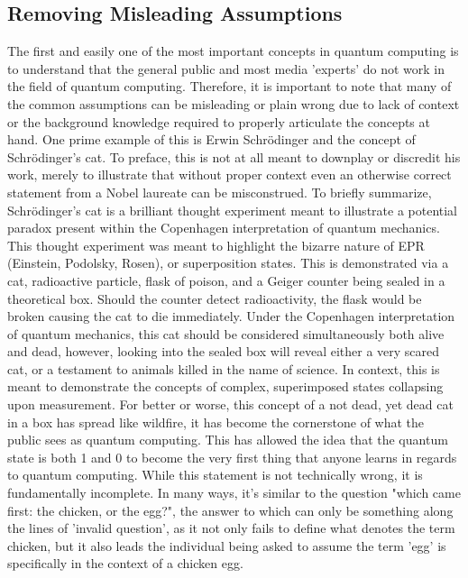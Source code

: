\documentclass[a4paper]{article}
\begin{document}
\subsection{Removing Misleading Assumptions} %
The first and easily one of the most important concepts in quantum computing is to understand that the general public and most media 'experts' do not work in the field of quantum computing.  Therefore, it is important to note that many of the common assumptions can be misleading or plain wrong due to lack of context or the background knowledge required to properly articulate the concepts at hand.\newline
\newline
One prime example of this is Erwin Schrödinger and the concept of Schrödinger's cat.  To preface, this is not at all meant to downplay or discredit his work, merely to illustrate that without proper context even an otherwise correct statement from a Nobel laureate can be misconstrued.  \newline
\newline %
To briefly summarize, Schrödinger's cat is a brilliant thought experiment meant to illustrate a potential paradox present within the Copenhagen interpretation of quantum mechanics.  This thought experiment was meant to highlight the bizarre nature of EPR (Einstein, Podolsky, Rosen), or superposition states.  This is demonstrated via a cat, radioactive particle, flask of poison, and a Geiger counter being sealed in a theoretical box.  Should the counter detect radioactivity, the flask would be broken causing the cat to die immediately.  Under the Copenhagen interpretation of quantum mechanics, this cat should be considered simultaneously both alive and dead, however, looking into the sealed box will reveal either a very scared cat, or a testament to animals killed in the name of science. \newline
\newline
In context, this is meant to demonstrate the concepts of complex, superimposed states collapsing upon measurement. For better or worse, this concept of a not dead, yet dead cat in a box has spread like wildfire, it has become the cornerstone of what the public sees as quantum computing. This has allowed the idea that the quantum state is both 1 and 0 to become the very first thing that anyone learns in regards to quantum computing.  While this statement is not technically wrong, it is fundamentally incomplete. In many ways, it's similar to the question "which came first: the chicken, or the egg?", the answer to which can only be something along the lines of 'invalid question', as it not only fails to define what denotes the term chicken, but it also leads the individual being asked to assume the term 'egg' is specifically in the context of a chicken egg. \newline
\end{document}
